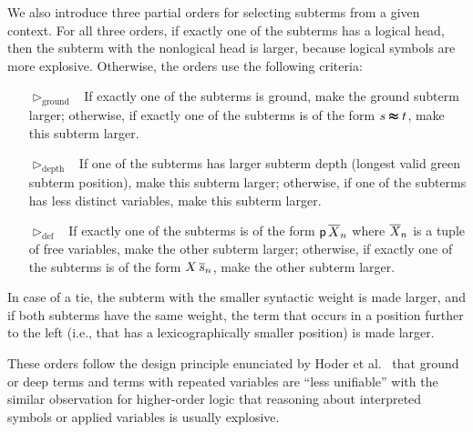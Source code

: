\documentclass[smallcondensed,draft]{svjour3}     %
\begin{document}
We also introduce three partial orders for selecting subterms from a given
context. For all three orders, if exactly one of the subterms has a logical head,
then the subterm with the nonlogical head is larger, because logical symbols
are more explosive. Otherwise, the orders use the following criteria:
%
\begin{enumerate}
  \item[$\vartriangleright_\text{ground}$~] If exactly one of the subterms is ground, make the
  ground subterm larger; otherwise, if exactly one of the subterms is of the form $s \pmb\approx
  t$, make this subterm larger.

\smallskip

  \item[$\vartriangleright_\text{depth}$~] If one of the subterms has larger subterm depth
  (longest valid green subterm position), make this subterm larger; otherwise, if one of the
  subterms has less distinct variables, make this subterm larger.

\smallskip

  \item[$\vartriangleright_\text{def}$~] If exactly one of the subterms is of the form
  $\mathsf{p}\,\overline{X}_{n}$ where $\overline{X}_{n}$ is a tuple of free variables, make
  the other subterm larger; otherwise, if exactly one of the subterms is of the form $X \,
  \overline{s}_{n}$, make the other subterm larger.
\end{enumerate}

In case of a tie, the subterm with the smaller syntactic weight is made larger,
and if both subterms have the same weight, the term that occurs in a position further
to the left (i.e., that has a lexicographically smaller position) is made larger.

These orders follow the design principle enunciated by Hoder et
al.~\cite{hrsv-16-selsel} that ground or deep terms and terms with repeated
variables are ``less unifiable'' with the similar observation for higher-order
logic that reasoning about interpreted symbols or applied variables is usually
explosive.
\end{document}
